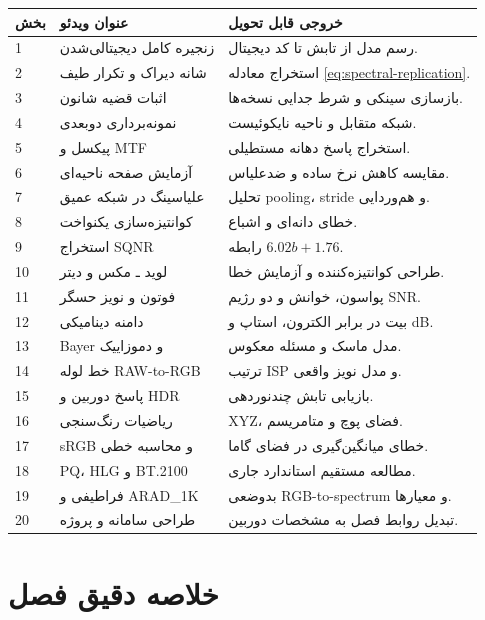 \documentclass[12pt,openany,oneside]{book}
\begin{document}
\begin{videobox}
\begin{longtable}{p{}p{}p{}}
\toprule
بخش & عنوان ویدئو & خروجی قابل تحویل\\
\midrule
1 & زنجیره کامل دیجیتالی‌شدن & رسم مدل از تابش تا کد دیجیتال.\\
2 & شانه دیراک و تکرار طیف & استخراج معادله \eqref{eq:spectral-replication}.\\
3 & اثبات قضیه شانون & بازسازی سینکی و شرط جدایی نسخه‌ها.\\
4 & نمونه‌برداری دوبعدی & شبکه متقابل و ناحیه نایکوئیست.\\
5 & پیکسل و MTF & استخراج پاسخ دهانه مستطیلی.\\
6 & آزمایش صفحه ناحیه‌ای & مقایسه کاهش نرخ ساده و ضدعلیاس.\\
7 & علیاسینگ در شبکه عمیق & تحلیل pooling، stride و هم‌وردایی.\\
8 & کوانتیزه‌سازی یکنواخت & خطای دانه‌ای و اشباع.\\
9 & استخراج SQNR & رابطه \(6.02b+1.76\).\\
10 & لوید ـ مکس و دیتر & طراحی کوانتیزه‌کننده و آزمایش خطا.\\
11 & فوتون و نویز حسگر & پواسون، خوانش و دو رژیم SNR.\\
12 & دامنه دینامیکی & بیت در برابر الکترون، استاپ و dB.\\
13 & Bayer و دموزاییک & مدل ماسک و مسئله معکوس.\\
14 & خط لوله RAW-to-RGB & ترتیب ISP و مدل نویز واقعی.\\
15 & پاسخ دوربین و HDR & بازیابی تابش چندنوردهی.\\
16 & ریاضیات رنگ‌سنجی & XYZ، فضای پوچ و متامریسم.\\
17 & sRGB و محاسبه خطی & خطای میانگین‌گیری در فضای گاما.\\
18 & PQ، HLG و BT.2100 & مطالعه مستقیم استاندارد جاری.\\
19 & فراطیفی و ARAD\_1K & بدوضعی RGB-to-spectrum و معیارها.\\
20 & طراحی سامانه و پروژه & تبدیل روابط فصل به مشخصات دوربین.\\
\bottomrule
\end{longtable}
\end{videobox}

\section{خلاصه دقیق فصل}
\end{document}
